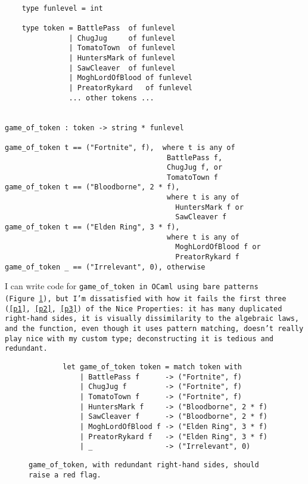 \documentclass[manuscript,screen,review, 12pt, nonacm]{acmart}
\begin{document}
\begin{minipage}[t]{\textwidth}
    \centering 
    \begin{verbatim}

    type funlevel = int

    type token = BattlePass  of funlevel 
               | ChugJug     of funlevel 
               | TomatoTown  of funlevel
               | HuntersMark of funlevel 
               | SawCleaver  of funlevel
               | MoghLordOfBlood of funlevel 
               | PreatorRykard   of funlevel
               ... other tokens ...
                   

game_of_token : token -> string * funlevel

game_of_token t == ("Fortnite", f),  where t is any of 
                                      BattlePass f, 
                                      ChugJug f, or
                                      TomatoTown f
game_of_token t == ("Bloodborne", 2 * f), 
                                      where t is any of 
                                        HuntersMark f or 
                                        SawCleaver f
game_of_token t == ("Elden Ring", 3 * f), 
                                      where t is any of 
                                        MoghLordOfBlood f or  
                                        PreatorRykard f
game_of_token _ == ("Irrelevant", 0), otherwise
    \end{verbatim}
\end{minipage}        
        
        I can write code for \tt{game\_of\_token} in OCaml using bare patterns
        (Figure~\ref{fig:baregot}), but I'm dissatisfied with how it fails the
        first three (\ref{p1}, \ref{p2}, \ref{p3}) of the Nice Properties: it
        has many duplicated right-hand sides, it is visually dissimilarity to
        the algebraic laws, and the function, even though it uses pattern
        matching, doesn't really play nice with my custom type; deconstructing
        it is tedious and redundant.         
        
        \begin{figure}
            \begin{center}
                \begin{verbatim}
        let game_of_token token = match token with 
            | BattlePass f      -> ("Fortnite", f)
            | ChugJug f         -> ("Fortnite", f)
            | TomatoTown f      -> ("Fortnite", f)
            | HuntersMark f     -> ("Bloodborne", 2 * f)
            | SawCleaver f      -> ("Bloodborne", 2 * f)
            | MoghLordOfBlood f -> ("Elden Ring", 3 * f)
            | PreatorRykard f   -> ("Elden Ring", 3 * f)
            | _                 -> ("Irrelevant", 0)
                \end{verbatim}
            \end{center}    

        \caption{\tt{game\_of\_token}, with redundant right-hand sides,
        should raise a red flag.} 
        \label{fig:baregot}
        \end{figure}
\end{document}
